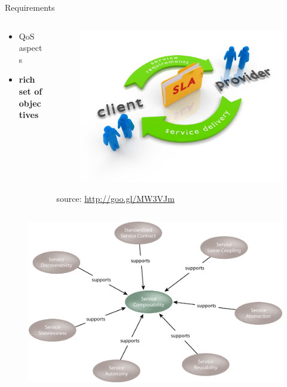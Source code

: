 \begin{frame}{Requirements}
{\begin{columns}
\begin{column}{0.55\textwidth}
\begin{itemize}
					\item{\footnotesize{QoS aspects}}
					\item{\footnotesize{\textbf{rich set of objectives}}}
				\end{itemize}
			\end{column}
			\begin{column}{0.45\textwidth}
				\begin{figure}
					\centering{}
					\includegraphics[scale=0.6]{images/sla.png}
				\end{figure}
				\begin{flushright}
					\tiny{source: \url{http://goo.gl/MW3VJm}}
				\end{flushright}
			\end{column}
		\end{columns}
	}
	{
		\begin{figure}
			\centering{}
			\includegraphics[scale=0.7]{images/composability.png}	

\end{figure}}
\end{frame}
